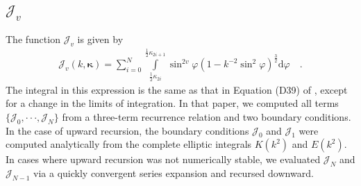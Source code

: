 \documentclass[modern]{aastex62}
\newcommand{\kap}{\boldsymbol{\kappa}}
\newcommand{\kmt}{k^{-2}}
\begin{document}
\subsection{$\mathcal{J}_v$}
%
The function $\mathcal{J}_v$ is given by
%
\begin{align}
    \label{eq:J}
    \mathcal{J}_v(k, \kap) =
    \sum_{i = 0}^N
    \int\limits_{\frac{1}{2}\kappa_{2i}}^{\frac{1}{2}\kappa_{2i+1}}
    \sin^{2v}\varphi
    \left(1 - \kmt\sin^2\varphi\right)^\frac{3}{2}
    \mathrm{d}\varphi
    \quad.
\end{align}
%
The integral in this expression is the same as that in Equation (D39)
of \citet{Luger2019}, except for a change in the limits of integration.
In that paper, we computed all terms
$\{ \mathcal{J}_0, {\cdot\cdot\cdot}, \mathcal{J}_N \}$ from a three-term
recurrence relation and two boundary conditions. In the case of upward recursion,
the boundary conditions $\mathcal{J}_0$ and $\mathcal{J}_1$ were computed
analytically from the complete elliptic
integrals $K(k^2)$ and $E(k^2)$. In cases where upward recursion was not
numerically stable, we evaluated $\mathcal{J}_N$ and $\mathcal{J}_{N-1}$
via a quickly convergent series expansion and recursed downward.
\end{document}
